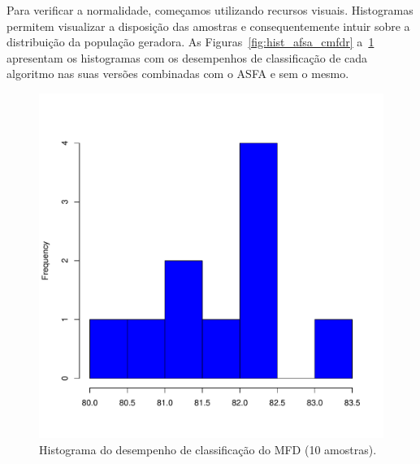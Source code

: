 \documentclass[conference]{IEEEtran}
\begin{document}
Para verificar a normalidade, começamos utilizando recursos visuais.
Histogramas permitem visualizar a disposição das amostras e consequentemente intuir sobre a distribuição da população geradora.
As Figuras~\ref{fig:hist_afsa_cmfdr} a~\ref{fig:hist_mfd} apresentam os histogramas com os desempenhos de classificação de cada algoritmo  nas suas versões combinadas com o ASFA e sem o mesmo.

\begin{figure}[h]
	\centering
	\includegraphics[width=\linewidth]{img/bluehist_mfd.pdf}
	\caption{Histograma do desempenho de classificação do MFD (10 amostras).}
	\label{fig:hist_mfd}
\end{figure}
\end{document}
